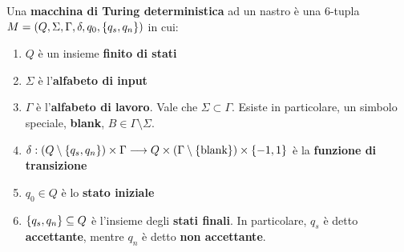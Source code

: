 \documentclass{lectures}
\begin{document}
\begin{definition}
    Una \textbf{macchina di Turing deterministica} ad un nastro è una \(6\)-tupla \(M=\left(Q,\Sigma,\Gamma,\delta, q_0, \left\{q_s, q_n\right\}\right)\) in cui:
    \begin{enumerate}
        \item \(Q\) è un insieme \textbf{finito di stati}
        \item \(\Sigma\) è l'\textbf{alfabeto di input}
        \item \(\Gamma\) è l'\textbf{alfabeto di lavoro}. Vale che \(\Sigma \subset \Gamma\). Esiste in particolare, un simbolo speciale, \textbf{blank}, \(B \in \Gamma\setminus\Sigma\).
        \item \(\delta:\left(Q\setminus\left\{q_s,q_n\right\}\right)\times\Gamma\longrightarrow Q\times\left(\Gamma\setminus\left\{\text{blank}\right\}\right)\times\left\{-1,1\right\}\) è la \textbf{funzione di transizione}
        \item \(q_0 \in Q\) è lo \textbf{stato iniziale}
        \item \(\left\{q_s, q_n\right\}\subseteq Q\) è l'insieme degli \textbf{stati finali}. In particolare, \(q_s\) è detto \textbf{accettante}, mentre \(q_n\) è detto \textbf{non accettante}.
    \end{enumerate}
\end{definition}
\end{document}

